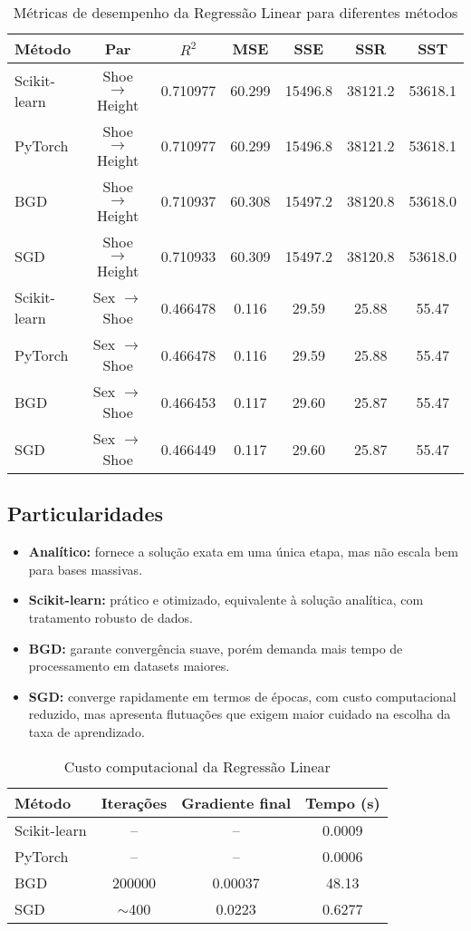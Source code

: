 \documentclass[a4paper]{article}
\begin{document}
\begin{answer}[Ítem 1.1]
\begin{table}[H]
\centering
\caption{Métricas de desempenho da Regressão Linear para diferentes métodos}
\begin{tabular}{lcccccc}
\toprule
Método & Par & $R^2$ & MSE & SSE & SSR & SST \\
\midrule
Scikit-learn & Shoe $\to$ Height & 0.710977 & 60.299 & 15496.8 & 38121.2 & 53618.1 \\
PyTorch      & Shoe $\to$ Height & 0.710977 & 60.299 & 15496.8 & 38121.2 & 53618.1 \\
BGD          & Shoe $\to$ Height & 0.710937 & 60.308 & 15497.2 & 38120.8 & 53618.0 \\
SGD          & Shoe $\to$ Height & 0.710933 & 60.309 & 15497.2 & 38120.8 & 53618.0 \\
\midrule
Scikit-learn & Sex $\to$ Shoe     & 0.466478 & 0.116 & 29.59   & 25.88   & 55.47 \\
PyTorch      & Sex $\to$ Shoe     & 0.466478 & 0.116 & 29.59   & 25.88   & 55.47 \\
BGD          & Sex $\to$ Shoe     & 0.466453 & 0.117 & 29.60   & 25.87   & 55.47 \\
SGD          & Sex $\to$ Shoe     & 0.466449 & 0.117 & 29.60   & 25.87   & 55.47 \\
\bottomrule
\end{tabular}
\end{table}

\subsection*{Particularidades}
\begin{itemize}
    \item \textbf{Analítico:} fornece a solução exata em uma única etapa, mas não escala bem para bases massivas.
    \item \textbf{Scikit-learn:} prático e otimizado, equivalente à solução analítica, com tratamento robusto de dados.
    \item \textbf{BGD:} garante convergência suave, porém demanda mais tempo de processamento em datasets maiores.
    \item \textbf{SGD:} converge rapidamente em termos de épocas, com custo computacional reduzido, mas apresenta flutuações que exigem maior cuidado na escolha da taxa de aprendizado.
\end{itemize}

\begin{table}[H]
\centering
\caption{Custo computacional da Regressão Linear}
\begin{tabular}{lccc}
\toprule
Método & Iterações & Gradiente final & Tempo (s) \\
\midrule
Scikit-learn & -- & -- & 0.0009 \\
PyTorch      & -- & -- & 0.0006 \\
BGD          & 200000 & 0.00037 & 48.13 \\
SGD          & $\sim$400 & 0.0223  & 0.6277 \\
\bottomrule
\end{tabular}
\end{table}

\end{answer}
\end{document}
